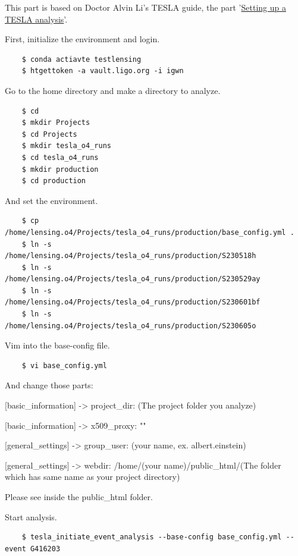 This part is based on Doctor Alvin Li's TESLA guide, the part '\href{https://git.ligo.org/alvin.li/tesla#settting-up-a-tesla-analysis}{Setting up a TESLA analysis}'.

First, initialize the environment and login.

\begin{verbatim}
    $ conda actiavte testlensing
    $ htgettoken -a vault.ligo.org -i igwn
\end{verbatim}

Go to the home directory and make a directory to analyze.

\begin{verbatim}
    $ cd
    $ mkdir Projects
    $ cd Projects
    $ mkdir tesla_o4_runs
    $ cd tesla_o4_runs
    $ mkdir production
    $ cd production
\end{verbatim}

And set the environment.

\begin{verbatim}
    $ cp /home/lensing.o4/Projects/tesla_o4_runs/production/base_config.yml .
    $ ln -s /home/lensing.o4/Projects/tesla_o4_runs/production/S230518h
    $ ln -s /home/lensing.o4/Projects/tesla_o4_runs/production/S230529ay
    $ ln -s /home/lensing.o4/Projects/tesla_o4_runs/production/S230601bf
    $ ln -s /home/lensing.o4/Projects/tesla_o4_runs/production/S230605o
\end{verbatim}

Vim into the base-config file.

\begin{verbatim}
    $ vi base_config.yml
\end{verbatim}

And change those parts:

[basic\_information] -> project\_dir: (The project folder you analyze)

[basic\_information] -> x509\_proxy: ""

[general\_settings] -> group\_user: (your name, ex. albert.einstein)

[general\_settings] -> webdir: /home/(your name)/public\_html/(The folder which has same name as your project directory)

Please see inside the public\_html folder.

Start analysis.

\begin{verbatim}
    $ tesla_initiate_event_analysis --base-config base_config.yml --event G416203
\end{verbatim}

